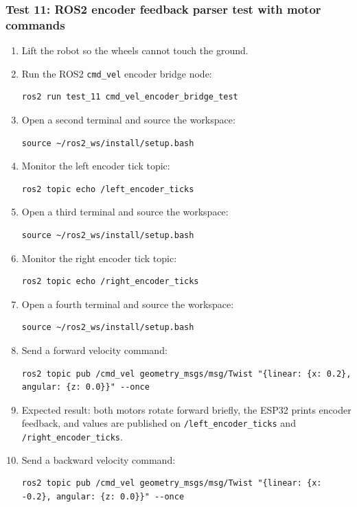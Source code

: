 \documentclass[12pt]{article}
\begin{document}
\subsubsection{Test 11: ROS2 encoder feedback parser test with motor commands}
\begin{enumerate}
    \item Lift the robot so the wheels cannot touch the ground.
    \item Run the ROS2 \texttt{cmd\_vel} encoder bridge node:
    \begin{verbatim}
ros2 run test_11 cmd_vel_encoder_bridge_test
    \end{verbatim}
    \item Open a second terminal and source the workspace:
    \begin{verbatim}
source ~/ros2_ws/install/setup.bash
    \end{verbatim}
    \item Monitor the left encoder tick topic:
    \begin{verbatim}
ros2 topic echo /left_encoder_ticks
    \end{verbatim}
    \item Open a third terminal and source the workspace:
    \begin{verbatim}
source ~/ros2_ws/install/setup.bash
    \end{verbatim}
    \item Monitor the right encoder tick topic:
    \begin{verbatim}
ros2 topic echo /right_encoder_ticks
    \end{verbatim}
    \item Open a fourth terminal and source the workspace:
    \begin{verbatim}
source ~/ros2_ws/install/setup.bash
    \end{verbatim}
    \item Send a forward velocity command:
    \begin{verbatim}
ros2 topic pub /cmd_vel geometry_msgs/msg/Twist "{linear: {x: 0.2}, angular: {z: 0.0}}" --once
    \end{verbatim}
    \item Expected result: both motors rotate forward briefly, the ESP32 prints encoder feedback, and values are published on \texttt{/left\_encoder\_ticks} and \texttt{/right\_encoder\_ticks}.
    \item Send a backward velocity command:
    \begin{verbatim}
ros2 topic pub /cmd_vel geometry_msgs/msg/Twist "{linear: {x: -0.2}, angular: {z: 0.0}}" --once

\end{verbatim}
\end{enumerate}
\end{document}

